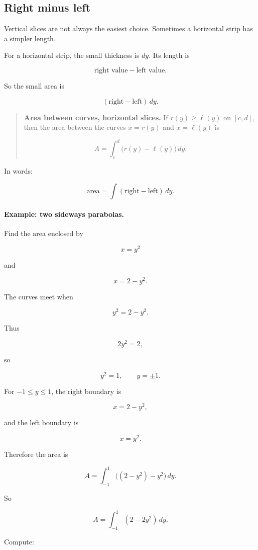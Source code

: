 \subsection{Right minus left}
\label{subsec:right-minus-left}

Vertical slices are not always the easiest choice.  Sometimes a horizontal strip has a
simpler length.

For a horizontal strip, the small thickness is \(dy\).  Its length is

\[
\text{right value}-\text{left value}.
\]

So the small area is

\[
(\text{right}-\text{left})\,dy.
\]

\begin{quote}
\textbf{Area between curves, horizontal slices.}
If \(r(y)\ge \ell(y)\) on \([c,d]\), then the area between the curves
\(x=r(y)\) and \(x=\ell(y)\) is

\[
\boxed{
A=\int_c^d \bigl(r(y)-\ell(y)\bigr)\,dy.
}
\]
\end{quote}

In words:

\[
\boxed{
\text{area}=\int(\text{right}-\text{left})\,dy.
}
\]

\paragraph{Example: two sideways parabolas.}
Find the area enclosed by

\[
x=y^2
\]

and

\[
x=2-y^2.
\]

The curves meet when

\[
y^2=2-y^2.
\]

Thus

\[
2y^2=2,
\]

so

\[
y^2=1,
\qquad
y=\pm1.
\]

For \(-1\le y\le1\), the right boundary is

\[
x=2-y^2,
\]

and the left boundary is

\[
x=y^2.
\]

Therefore the area is

\[
A=\int_{-1}^1 \bigl((2-y^2)-y^2\bigr)\,dy.
\]

So

\[
A=\int_{-1}^1 (2-2y^2)\,dy.
\]

Compute:

